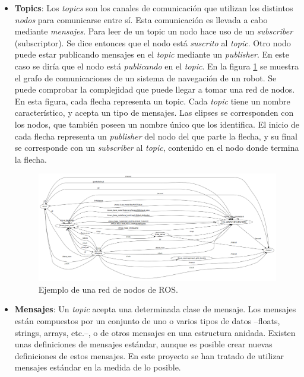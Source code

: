 \documentclass[12pt, a4paper]{report}
\begin{document}
\begin{itemize}
\begin{itemize}
\item \textbf{Topics}: Los \textit{topics} son los canales de comunicación que utilizan los distintos \textit{nodos} para comunicarse entre sí. Esta comunicación es llevada a cabo mediante \textit{mensajes}. Para leer de un topic un nodo hace uso de un \textit{subscriber} (subscriptor). Se dice entonces que el nodo está \textit{suscrito} al \textit{topic}. Otro nodo puede estar publicando mensajes en el \textit{topic} mediante un \textit{publisher}. En este caso se diría que el nodo está \textit{publicando} en el \textit{topic}. En la figura \ref{fig: ros_nodes} se muestra el grafo de comunicaciones de un sistema de navegación de un robot. Se puede comprobar la complejidad que puede llegar a tomar una red de nodos. En esta figura, cada flecha representa un topic. Cada \textit{topic} tiene un nombre característico, y acepta un tipo de mensajes. Las elipses se corresponden con los nodos, que también poseen un nombre único que los identifica. El inicio de cada flecha representa un \textit{publisher} del nodo del que parte la flecha, y su final se corresponde con un \textit{subscriber} al \textit{topic}, contenido en el nodo donde termina la flecha.

\begin{figure}[h]
	\centering
		\includegraphics[scale=0.35]{../img/rosgraph.png} 
	\caption[Ejemplo de una red de nodos de ROS]{Ejemplo de una red de nodos de ROS.} 
	\label{fig: ros_nodes}
\end{figure}

\item \textbf{Mensajes}: Un \textit{topic} acepta una determinada clase de mensaje. Los mensajes están compuestos por un conjunto de uno o varios tipos de datos --floats, strings, arrays, etc.--, o de otros mensajes en una estructura anidada. Existen unas definiciones de mensajes estándar, aunque es posible crear nuevas definiciones de estos mensajes. En este proyecto se han tratado de utilizar mensajes estándar en la medida de lo posible.


\end{itemize}
\end{itemize}
\end{document}
